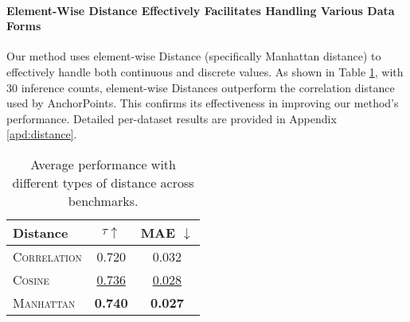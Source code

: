 \paragraph{Element-Wise Distance Effectively Facilitates Handling Various Data Forms} 
Our method uses element-wise Distance (specifically Manhattan distance) to effectively handle both continuous and discrete values. As shown in Table \ref{tab:distance}, with 30 inference counts, element-wise Distances outperform the correlation distance used by AnchorPoints. This confirms its effectiveness in improving our method’s performance. Detailed per-dataset results are provided in Appendix \ref{apd:distance}.
\begin{table}[htbp]
\renewcommand\arraystretch{1}
\centering
\setlength{\tabcolsep}{1.25em} 
\begin{tabular}{l cc}
\toprule
\textbf{Distance}& \textbf{$\tau \uparrow$} & {\scriptsize \textbf{MAE} $\downarrow$}  \\ 
\midrule
\textsc{Correlation}    & 0.720 & 0.032 \\
\textsc{Cosine}         & \uline{0.736} & \uline{0.028}  \\
\textsc{Manhattan}      & \textbf{0.740} & \textbf{0.027} \\
\bottomrule
\end{tabular}
\caption{Average performance with different types of distance across benchmarks.}
\label{tab:distance}
\vspace{-0.5cm}
\end{table}


